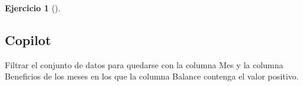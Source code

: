 \documentclass[
  a4paper,
]{scrreport}
\newenvironment{Shaded}{\begin{snugshade}}{\end{snugshade}}
\newcommand{\ExtensionTok}[1]{\textcolor[rgb]{0.00,0.23,0.31}{#1}}
\newcommand{\NormalTok}[1]{\textcolor[rgb]{0.00,0.23,0.31}{#1}}
\theoremstyle{definition}
\newtheorem{exercise}{Ejercicio}[chapter]
\theoremstyle{remark}
\begin{document}
\begin{exercise}[]
\begin{enumerate}
\begin{tcolorbox}
  \section{Copilot}

\begin{Shaded}
\begin{Highlighting}[]
\ExtensionTok{Filtrar}\NormalTok{ el conjunto de datos para quedarse con la columna Mes y la columna Beneficios de los meses en los que la columna Balance contenga el valor positivo.}
\end{Highlighting}
\end{Shaded}

  \end{tcolorbox}
\end{enumerate}

\end{exercise}
\end{document}
